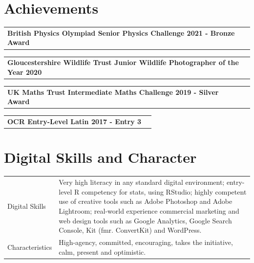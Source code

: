 \documentclass[a4paper,12pt]{article}
\begin{document}

\section{Achievements}

\begin{tabularx}{\linewidth}{ @{}l r@{} }
\textbf{British Physics Olympiad Senior Physics Challenge 2021 - Bronze Award} \\ [3.75pt]

\end{tabularx}

\begin{tabularx}{\linewidth}{ @{}l r@{} }
\textbf{Gloucestershire Wildlife Trust Junior Wildlife Photographer of the Year 2020} \\ [3.75pt]

\end{tabularx}

\begin{tabularx}{\linewidth}{ @{}l r@{} }
\textbf{UK Maths Trust Intermediate Maths Challenge 2019 - Silver Award} \\ [3.75pt]

\end{tabularx}

\begin{tabularx}{\linewidth}{ @{}l r@{} }
\textbf{OCR Entry-Level Latin 2017 - Entry 3} \\ [3.75pt]

\end{tabularx}


\section{Digital Skills and Character}
\begin{tabularx}{\linewidth}{@{}l X@{}}
Digital Skills &  \normalsize{Very high literacy in any standard digital environment; entry-level R competency for stats, using RStudio; highly competent use of creative tools such as Adobe Photoshop and Adobe Lightroom; real-world experience commercial marketing and web design tools such as Google Analytics, Google Search Console, Kit (fmr. ConvertKit) and WordPress.} \\
Characteristics & \normalsize{High-agency, committed, encouraging, takes the initiative, calm, present and optimistic.}
\end{tabularx}

\vfill
{}
\end{document}
